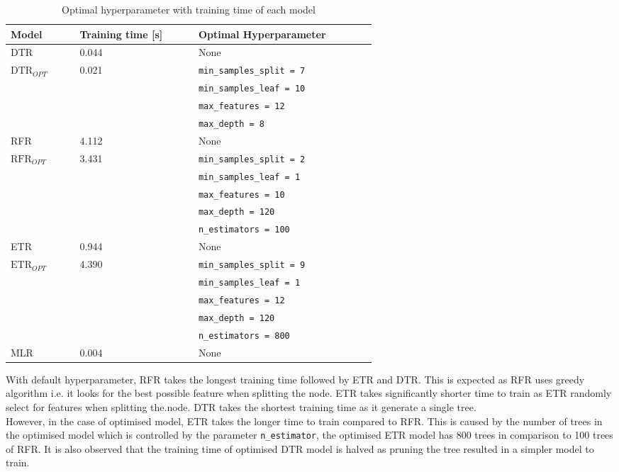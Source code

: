 \begin{table}[ht]
    \footnotesize
    \centering
    {\begin{tabular}{ p{0.1\linewidth} p{0.2\linewidth} p{0.3\linewidth}}
    \hline
    Model & Training time [s] & Optimal Hyperparameter \\
    \hline
    DTR & 0.044 & None \\
    $\text{DTR}_{OPT}$ & 0.021  & {\tt min\_samples\_split = 7}\\
    &&{\tt min\_samples\_leaf = 10}\\
    &&{\tt max\_features = 12}\\
    &&{\tt max\_depth = 8}\\
    RFR & 4.112 & None \\
    $\text{RFR}_{OPT}$ & 3.431  & {\tt min\_samples\_split = 2}\\
    &&{\tt min\_samples\_leaf = 1}\\
    &&{\tt max\_features = 10}\\
    &&{\tt max\_depth = 120}\\
    &&{\tt n\_estimators = 100}\\
    ETR & 0.944 & None \\
    $\text{ETR}_{OPT}$ & 4.390  & {\tt min\_samples\_split = 9}\\
    &&{\tt min\_samples\_leaf = 1}\\
    &&{\tt max\_features = 12}\\
    &&{\tt max\_depth = 120}\\
    &&{\tt n\_estimators = 800}\\
    MLR & 0.004  & None\\
    \hline
    \end{tabular}}
\caption{Optimal hyperparameter with training time of each model}\label{tbl:hpo_optimal}
\end{table}

With default hyperparameter, RFR takes the longest training time followed by ETR and DTR. This is expected as RFR uses greedy algorithm i.e. it looks for the best possible feature when splitting the node. ETR takes significantly shorter time to train as ETR randomly select for features when splitting the.node. DTR takes the shortest training time as it generate a single tree.\\

However, in the case of optimised model, ETR takes the longer time to train compared to RFR. This is caused by the number of trees in the optimised model which is controlled by the parameter {\tt n\_estimator}, the optimised ETR model has 800 trees in comparison to 100 trees of RFR. It is also observed that the training time of optimised DTR model is halved as pruning the tree resulted in a simpler model to train. \\

